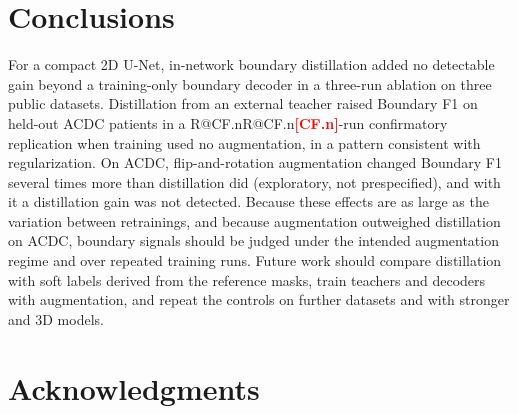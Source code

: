 \documentclass[fleqn,10pt,lineno]{wlpeerj}
\makeatletter
\newcommand{\R}[1]{\ifcsname R@#1\endcsname\csname R@#1\endcsname\else\textbf{\textcolor{red}{[#1]}}\fi}
\makeatother
\begin{document}
\section*{Conclusions}
For a compact 2D U-Net, in-network boundary distillation added no detectable gain beyond a training-only boundary decoder in a three-run ablation on three public datasets. Distillation from an external teacher raised Boundary F1 on held-out ACDC patients in a \R{CF.n}-run confirmatory replication when training used no augmentation, in a pattern consistent with regularization. On ACDC, flip-and-rotation augmentation changed Boundary F1 several times more than distillation did (exploratory, not prespecified), and with it a distillation gain was not detected. Because these effects are as large as the variation between retrainings, and because augmentation outweighed distillation on ACDC, boundary signals should be judged under the intended augmentation regime and over repeated training runs. Future work should compare distillation with soft labels derived from the reference masks, train teachers and decoders with augmentation, and repeat the controls on further datasets and with stronger and 3D models.

\section*{Acknowledgments}



\end{document}
